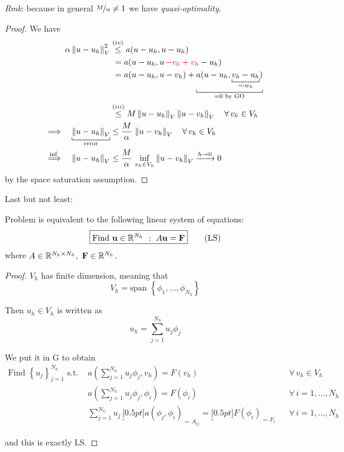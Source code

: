 \begin{itemize}
\emph{Rmk}: because in general $\nicefrac{M}{\alpha}\neq 1$ we have \emph{quasi-optimality}.

\begin{proof}
We have
\begin{align*}
\alpha\norm{u-u_h}_V^2&\overset{(iv)}{\leq} a(u-u_h,u-u_h) \\
&\,\,=a(u-u_h,u\,{\color{red}-v_h+v_h}-u_h) \\
&\,\,=a(u-u_h,u-v_h)+\underbracket[0.5pt]{a(u-u_h,\underbracket[0.5pt]{v_h-u_h}_{\eqcolon w_h})}_{=0\text{ by GO}} \\
&\overset{(iii)}{\leq} M \norm{u-u_h}_V \norm{u-v_h}_V\quad \forall\,v_h\in V_h \\
\Longrightarrow\quad \underbracket[0.5pt]{ \norm{u-u_h}_V }_{\text{error}}&\leq \frac{M}{\alpha}\,\norm{u-v_h}_V\quad\forall\,v_h\in V_h \\
\overset{\text{inf }}{\Longrightarrow}\quad \norm{u-u_h}_V &\leq \frac{M}{\alpha}\,\inf_{v_h\in V_h}\norm{u-v_h}_V \xrightarrow{h\to 0} 0
\end{align*}
by the space saturation assumption.
\end{proof}
\end{itemize}

Last but not least: 
\begin{theorem}
Problem {} is equivalent to the following linear system of equations:
\begin{equation*}
\boxed{\text{\normalfont Find } \mathbf{u}\in\mathbb{R}^{N_h}\ :\ A\mathbf{u}=\mathbf{F}}\tag{LS}
\end{equation*}
where $A\in\RR^{N_h\times N_h},\ \Fv\in\RR^{N_h}$.    
\end{theorem}\vspace{-0.5cm}

\begin{proof}
$V_h$ has finite dimension, meaning that
\begin{equation*}
V_h=\text{span }\left\{ \phi_1,\dots,\phi_{N_h} \right\}
\end{equation*}

Then $u_h\in V_h$ is written as
\begin{equation*}
u_h=\sum_{j=1}^{N_h} u_j\phi_j
\end{equation*}

We put it in G to obtain
\begin{align*}
\text{Find } \left\{ u_j \right\}_{j=1}^{N_h}\text{ s.t. } & a \left( \sum_{j=1}^{N_h} u_j\phi_j,v_h  \right)=F(v_h) && \forall\,v_h\in V_h \\
& a \left( \sum_{j=1}^{N_h} u_j\phi_j,\phi_i  \right)=F(\phi_i) && \forall\,i=1,\dots,N_h \\
& \sum_{j=1}^{N_h} u_j\, \underbracket[0.5pt]{a(\phi_j,\phi_i)}_{\eqcolon A_{ij}}=\underbracket[0.5pt]{F(\phi_i)}_{\eqcolon F_{i}} && \forall\,i=1,\dots,N_h
\end{align*}

and this is exactly LS.
\end{proof}

